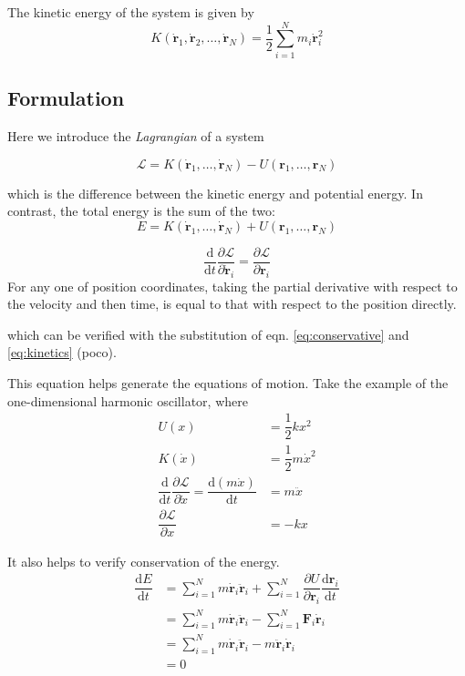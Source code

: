 \documentclass[
  10pt,
  twoside,
  openany,
  b5paper, %
  colorscheme = bootstrap-v4, %
]{qyxf-book}
\newcommand{\der}[2]{\dfrac{\md #1}{\md #2}}
\newcommand{\p}[2]{\dfrac{\partial #1}{\partial #2}}
\newcommand{\md}{\mathrm{d}}
\newcommand{\vF}{\boldsymbol{F}}
\newcommand{\vr}{\boldsymbol{r}}
\newcommand{\dvr}{\dot{\vr}}
\newcommand{\ddvr}{\ddot{\vr}}
\newcommand{\half}{\dfrac{1}{2}}
\newcommand{\sumin}{\sum_{i=1}^N}
\newcommand{\lag}{\mathcal{L}} %
\begin{document}
The kinetic energy of the system is given by
\begin{equation}
	K(\dvr_1, \dvr_2, \dots, \dvr_N)=\half\sum_{i=1}^{N}m_i\dvr_i^2 \label{eq:kinetics}
\end{equation}

\subsection{Formulation}
Here we introduce the \textit{Lagrangian} of a system
\begin{tcolorbox}
	\begin{equation}
		\lag=K(\dvr_1, \dots, \dvr_N)-U(\vr_1, \dots, \vr_N)
	\end{equation}
\end{tcolorbox}
which is the difference between the kinetic energy and potential energy. In contrast, the total energy is the sum of the two:
\begin{equation}
	E=K(\dvr_1, \dots, \dvr_N)+U(\vr_1, \dots, \vr_N)
\end{equation}

\begin{tcolorbox}[title={The Euler-Lagrangian equation}]
	\begin{equation}
		\der{}{t}\p{\lag}{\dvr_i}=\p{\lag}{\vr_i} \label{eq:euler-lagrangian}
	\end{equation}
	For any one of position coordinates, taking the partial derivative with respect to the velocity and then time, is equal to that with respect to the position directly.
\end{tcolorbox}
which can be verified with the substitution of eqn. \ref{eq:conservative} and \ref{eq:kinetics} (poco).

This equation helps generate the equations of motion. Take the example of the one-dimensional harmonic oscillator, where
\begin{align*}
	U(x)&=\half kx^2\\
	K(\dot{x})&=\half m\dot{x}^2\\
	\der{}{t}\p{\lag}{\dot{x}}=\der{(m\dot{x})}{t}&=m\ddot{x}\\
	\p{\lag}{x}&=-kx
\end{align*}

It also helps to verify conservation of the energy.
\begin{align*}
	\der{E}{t}&=\sumin m\dvr_i\ddvr_i+\sumin\p{U}{\vr_i}\der{\vr_i}{t}\\
	&=\sumin m\dvr_i\ddvr_i-\sumin\vF_i\dvr_i\\
	&=\sumin m\dvr_i\ddvr_i-m\ddvr_i\dvr_i\\
	&=0
\end{align*}
\end{document}
